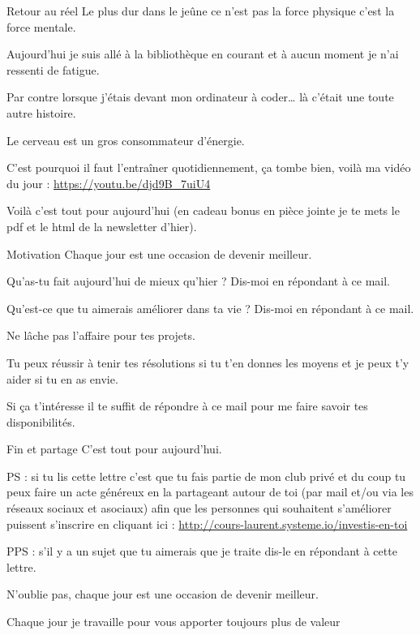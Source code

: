 \documentclass[presentation]{beamer}
\begin{document}
\begin{frame}[label={sec:org6e9959d}]{Retour au réel}
Le plus dur dans le jeûne ce n'est pas la force physique c'est la force mentale.



Aujourd'hui je suis allé à la bibliothèque en courant et à aucun moment je n'ai ressenti de fatigue.



Par contre lorsque j'étais devant mon ordinateur à coder\ldots{} là c'était une toute autre histoire.



Le cerveau est un gros consommateur d'énergie.



C'est pourquoi il faut l'entraîner quotidiennement, ça tombe bien, voilà ma vidéo du jour : \url{https://youtu.be/djd9B\_7uiU4}



Voilà c'est tout pour aujourd'hui (en cadeau bonus en pièce jointe je te mets le pdf et le html de la newsletter d'hier). 
\end{frame}

\begin{frame}[label={sec:orgb01aa47}]{Motivation}
Chaque jour est une occasion de devenir meilleur.



Qu'as-tu fait aujourd'hui de mieux qu'hier ? Dis-moi en répondant à ce mail.




Qu'est-ce que tu aimerais améliorer dans ta vie ? Dis-moi en répondant à ce mail.





Ne lâche pas l'affaire pour tes projets. 





Tu peux réussir à tenir tes résolutions si tu t'en donnes les moyens et je peux t'y aider si tu en as envie. 





Si ça t'intéresse il te suffit de répondre à ce mail pour me faire savoir tes disponibilités. 
\end{frame}




\begin{frame}[label={sec:org028628f}]{Fin et partage}
C'est tout pour aujourd'hui.



PS : si tu lis cette lettre c'est que tu fais partie de mon club privé et du coup tu peux faire un acte généreux en la partageant autour de toi (par mail et/ou via les réseaux sociaux et asociaux) afin que les personnes qui souhaitent s'améliorer puissent s'inscrire en cliquant ici : \url{http://cours-laurent.systeme.io/investis-en-toi}

PPS : s'il y a un sujet que tu aimerais que je traite dis-le en répondant à cette lettre.


N'oublie pas, chaque jour est une occasion de devenir meilleur.


Chaque jour je travaille pour vous apporter toujours plus de valeur
\end{frame}
\end{document}
